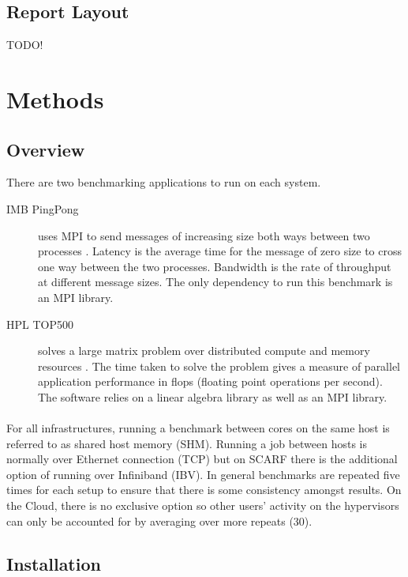 \documentclass{article}
\begin{document}
    \subsection{Report Layout}
    TODO!

\section{Methods}

    \subsection{Overview}
    \label{overview-of-methods}
    There are two benchmarking applications to run on each system.

    \begin{description}
        \item[IMB PingPong] uses MPI to send messages of increasing size both ways between two processes \cite{intel2016}. Latency is the average time for the message of zero size to cross one way between the two processes. Bandwidth is the rate of throughput at different message sizes. The only dependency to run this benchmark is an MPI library.
        \item[HPL TOP500] solves a large matrix problem over distributed compute and memory resources \cite{hpl2016}. The time taken to solve the problem gives a measure of parallel application performance in flops (floating point operations per second). The software relies on a linear algebra library as well as an MPI library.
    \end{description}

    \paragraph{}
    For all infrastructures, running a benchmark between cores on the same host is referred to as shared host memory (SHM). Running a job between hosts is normally over Ethernet connection (TCP) but on SCARF there is the additional option of running over Infiniband (IBV). In general benchmarks are repeated five times for each setup to ensure that there is some consistency amongst results. On the Cloud, there is no exclusive option so other users' activity on the hypervisors can only be accounted for by averaging over more repeats (30).

    \subsection{Installation} \label{installation}
\end{document}
